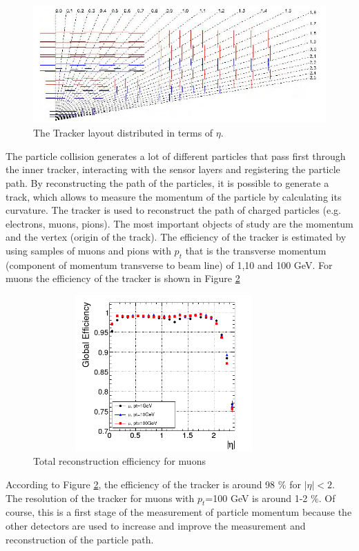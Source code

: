 \begin{figure}[ht]
	\centering
	\includegraphics[scale=0.7]{Chapter2/pixel2.png}
	\caption[The Tracker layout distributed in terms of $\eta$]{The Tracker layout distributed in terms of $\eta$\cite{cms-manual}.}
	\label{pixel2}
\end{figure}
The particle collision generates a lot of different particles that pass first through the inner tracker, interacting with the sensor layers and registering the particle path.
By reconstructing the path of the particles, it is possible to generate a track, which allows to measure the momentum of the particle by calculating its curvature. The tracker is used to reconstruct the path of charged particles (e.g. electrons, muons, pions). The most important objects of study are the momentum and the vertex (origin of the track). The efficiency of the tracker is estimated by using samples of muons and pions with $p_t$ that is the transverse momentum (component of momentum transverse to beam line) of 1,10 and 100 GeV. 
For muons the efficiency of the tracker is shown in Figure \ref{efi}
\begin{figure}[ht]
	\centering
	\includegraphics[width=10cm,height=6cm]{Chapter2/tracker.png}
	\caption[Total reconstruction efficiency for muons]{Total reconstruction efficiency for muons\cite{cms-manual} }\label{efi}
\end{figure}

According to Figure \ref{efi}, the efficiency of the tracker is around 98 $\%$ for $|\eta|<2$. The resolution of the tracker for muons with $p_t$=100 GeV is around 1-2 $\%$.
Of course, this is a first stage of the measurement of particle momentum because the other detectors are used to increase and improve the measurement and reconstruction of the particle path.

